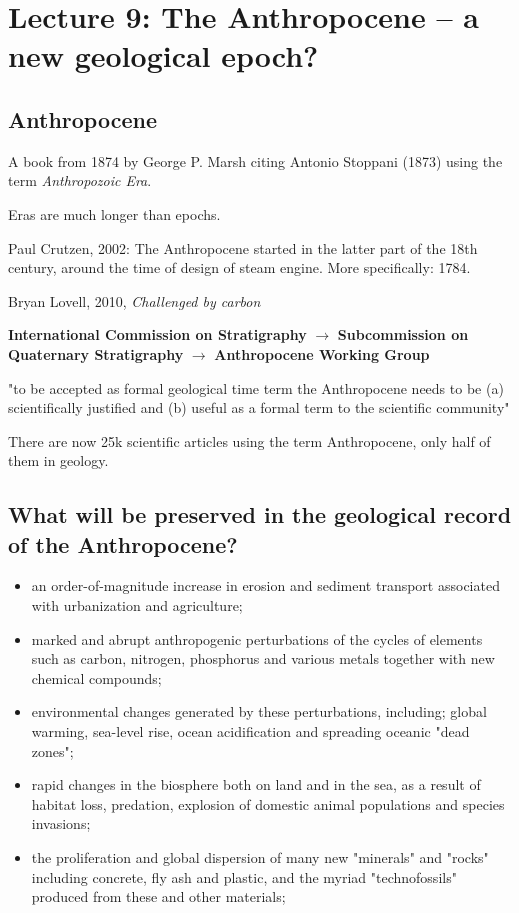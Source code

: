 \section{Lecture 9: The Anthropocene -- a new geological epoch?}

\subsection{Anthropocene}

A book from 1874 by George P. Marsh citing Antonio Stoppani (1873) using the
term \textit{Anthropozoic Era}.

Eras are much longer than epochs.

Paul Crutzen, 2002: The Anthropocene started in the latter part of the
18th century, around the time of design of steam engine. More specifically:
1784.

Bryan Lovell, 2010, \textit{Challenged by carbon} 

\textbf{International Commission on Stratigraphy} $\rightarrow$
\textbf{Subcommission on Quaternary Stratigraphy} $\rightarrow$
\textbf{Anthropocene Working Group}

"to be accepted as formal geological time term the Anthropocene needs to be
(a) scientifically justified and (b) useful as a formal term to the scientific
community"

There are now 25k scientific articles using the term Anthropocene, only half of
them in geology.

\subsection{What will be preserved in the geological record of the
Anthropocene?}

\begin{itemize}
	\item an order-of-magnitude increase in erosion and sediment transport
	 associated with urbanization and agriculture;
	\item marked and abrupt anthropogenic perturbations of the cycles of
	 elements such as carbon, nitrogen, phosphorus and various metals
	 together with new chemical compounds;
	\item environmental changes generated by these perturbations, including;
	 global warming, sea-level rise, ocean acidification and spreading
	 oceanic "dead zones";
	\item rapid changes in the biosphere both on land and in the sea, as a
	 result of habitat loss, predation, explosion of domestic animal
	 populations and species invasions;
	\item the proliferation and global dispersion of many new "minerals"
	 and "rocks" including concrete, fly ash and plastic, and the myriad
	 "technofossils" produced from these and other materials;
\end{itemize}

